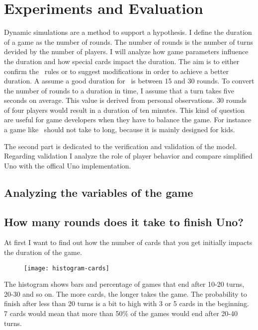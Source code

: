
\section{Experiments and Evaluation}

Dynamic simulations are a method to support a hypothesis. I define the duration of a game as the number of rounds. The number of rounds is the number of turns devided by the number of players. I will analyze how game parameters influence the duration and how special cards impact the duration. The aim is to either confirm the \uno\ rules or to suggest modifications in order to achieve a better duration. A assume a good duration for \uno\ is between 15 and 30 rounds. To convert the number of rounds to a duration in time, I assume that a turn takes five seconds on average. This value is derived from personal observations. 30 rounds of four players would result in a duration of ten minutes.
This kind of question are useful for game developers when they have to balance the game. For instance a game like \uno\ should not take to long, because it is mainly designed for kids.

The second part is dedicated to the verification and validation of the model. Regarding validation I analyze the role of player behavior and compare simplified Uno with the offical Uno implementation.

\subsection{Analyzing the variables of the game}



\subsection{How many rounds does it take to finish Uno?}

At first I want to find out how the number of cards that you get initially impacts the duration of the game. 

\begin{figure}[h!]
  \caption{}
  \texttt{[image: histogram-cards]}
\end{figure}


The histogram shows bars and percentage of games that end after 10-20 turns, 20-30 and so on. The more cards, the longer takes the game. The probability to finish after less than 20 turns is a bit to high with 3 or 5 cards in the beginning. 7 cards would mean that more than 50\% of the games would end after 20-40 turns.


